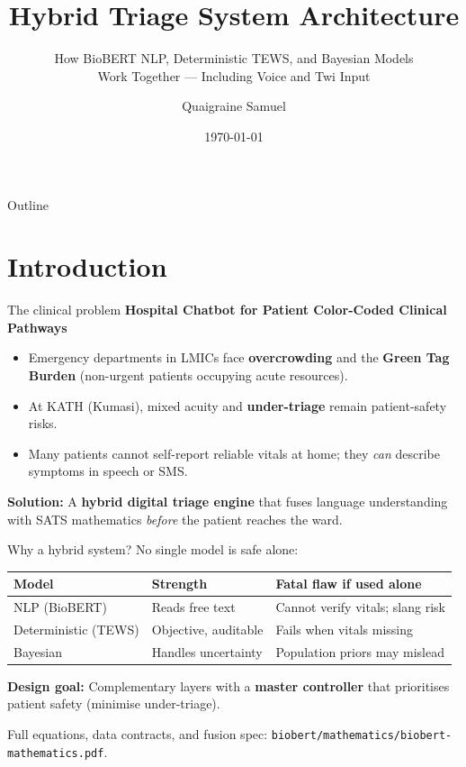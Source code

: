 \documentclass[aspectratio=169,11pt]{beamer}
\title[Hybrid Triage System]{Hybrid Triage System Architecture}
\subtitle{How BioBERT NLP, Deterministic TEWS, and Bayesian Models\\Work Together --- Including Voice and Twi Input}
\author{Quaigraine Samuel}
\institute{Department of Mathematics\\Kwame Nkrumah University of Science and Technology}
\date{\today}
\begin{document}
\begin{frame}
	\titlepage
\end{frame}

\begin{frame}{Outline}
	\tableofcontents[hideallsubsections]
\end{frame}

\section{Introduction}

\begin{frame}{The clinical problem}
	\textbf{Hospital Chatbot for Patient Color-Coded Clinical Pathways}

	\vspace{0.3em}
	\begin{itemize}
		\item Emergency departments in LMICs face \textbf{overcrowding} and the \textbf{Green Tag Burden} (non-urgent patients occupying acute resources).
		\item At KATH (Kumasi), mixed acuity and \textbf{under-triage} remain patient-safety risks.
		\item Many patients cannot self-report reliable vitals at home; they \textit{can} describe symptoms in speech or SMS.
	\end{itemize}

	\vspace{0.3em}
	\textbf{Solution:} A \textbf{hybrid digital triage engine} that fuses language understanding with SATS mathematics \textit{before} the patient reaches the ward.
\end{frame}

\begin{frame}{Why a hybrid system?}
	No single model is safe alone:

	\begin{center}
		\small
		\begin{tabular}{@{}lll@{}}
			\toprule
			\textbf{Model} & \textbf{Strength} & \textbf{Fatal flaw if used alone} \\
			\midrule
			NLP (BioBERT) & Reads free text & Cannot verify vitals; slang risk \\
			Deterministic (TEWS) & Objective, auditable & Fails when vitals missing \\
			Bayesian & Handles uncertainty & Population priors may mislead \\
			\bottomrule
		\end{tabular}
	\end{center}

	\vspace{0.4em}
	\textbf{Design goal:} Complementary layers with a \textbf{master controller} that prioritises patient safety (minimise under-triage).

	\vspace{0.2em}
	\footnotesize Full equations, data contracts, and fusion spec: \texttt{biobert/mathematics/biobert-mathematics.pdf}.
\end{frame}
\end{document}
